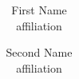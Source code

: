 \documentclass[letterpaper,twocolumn,10pt]{article}
\begin{document}
\date{}

\title{\Large \bf}

\author{
{\rm First Name}\\
affiliation
\and
{\rm Second Name}\\
affiliation
}

\maketitle

\thispagestyle{empty}











\begin{footnotesize}
%


\end{footnotesize}
\end{document}
